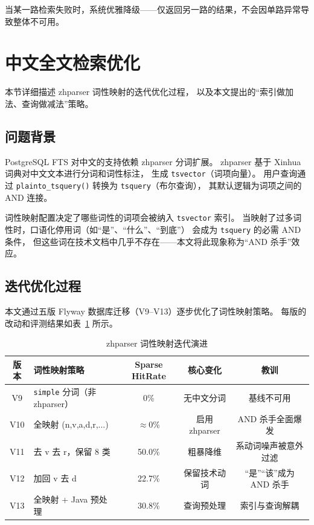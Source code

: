 \documentclass[a4paper, 12pt]{ctexart}
\begin{document}
当某一路检索失败时，系统优雅降级——仅返回另一路的结果，不会因单路异常导致整体不可用。

\section{中文全文检索优化}
\label{sec:zhparser}

本节详细描述 zhparser 词性映射的迭代优化过程，
以及本文提出的``索引做加法、查询做减法''策略。

\subsection{问题背景}

PostgreSQL FTS 对中文的支持依赖 zhparser 分词扩展。
zhparser 基于 Xinhua 词典对中文文本进行分词和词性标注，
生成 \texttt{tsvector}（词项向量）。
用户查询通过 \texttt{plainto\_tsquery()} 转换为 \texttt{tsquery}（布尔查询），
其默认逻辑为词项之间的 AND 连接。

词性映射配置决定了哪些词性的词项会被纳入 \texttt{tsvector} 索引。
当映射了过多词性时，口语化停用词（如``是''、``什么''、``到底''）
会成为 \texttt{tsquery} 的必需 AND 条件，
但这些词在技术文档中几乎不存在——本文将此现象称为``AND 杀手''效应。

\subsection{迭代优化过程}

本文通过五版 Flyway 数据库迁移（V9--V13）逐步优化了词性映射策略。
每版的改动和评测结果如表~\ref{tab:zhparser} 所示。

\begin{table}[H]
  \centering
  \caption{zhparser 词性映射迭代演进}
  \label{tab:zhparser}
  \begin{tabular}{clccc}
    \toprule
    版本 & 词性映射策略 & Sparse HitRate & 核心变化 & 教训 \\
    \midrule
    V9  & \texttt{simple} 分词（非 zhparser） & 0\% & 无中文分词 & 基线不可用 \\
    V10 & 全映射 (n,v,a,d,r,...) & $\approx$0\% & 启用 zhparser & AND 杀手全面爆发 \\
    V11 & 去 v 去 r，保留 8 类 & 50.0\% & 粗暴降维 & 系动词噪声被意外过滤 \\
    V12 & 加回 v 去 d & 22.7\% & 保留技术动词 & ``是''``该''成为 AND 杀手 \\
    V13 & 全映射 + Java 预处理 & 30.8\% & 查询预处理 & 索引与查询解耦 \\
    \bottomrule
  \end{tabular}
\end{table}
\end{document}

